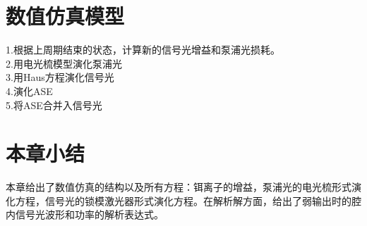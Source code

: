 \section{数值仿真模型}
1.根据上周期结束的状态，计算新的信号光增益和泵浦光损耗。\\
2.用电光梳模型演化泵浦光\\
3.用Haus方程演化信号光\\
4.演化ASE\\
5.将ASE合并入信号光\\
\section{本章小结}
本章给出了数值仿真的结构以及所有方程：铒离子的增益，泵浦光的电光梳形式演化方程，信号光的锁模激光器形式演化方程。在解析解方面，给出了弱输出时的腔内信号光波形和功率的解析表达式。
